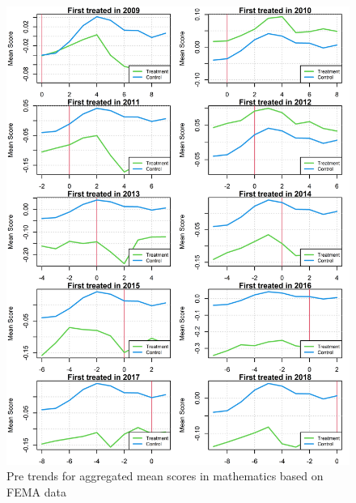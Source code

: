 \begin{figure}[!h]
	\centering
	\includegraphics[scale=1]{"../Code & Data/ParTrendsPlotMathematicsFEMA.png"}
	\caption{Pre trends for aggregated mean scores in mathematics based on FEMA data}
	\label{PreTrendsMath}
\end{figure}


